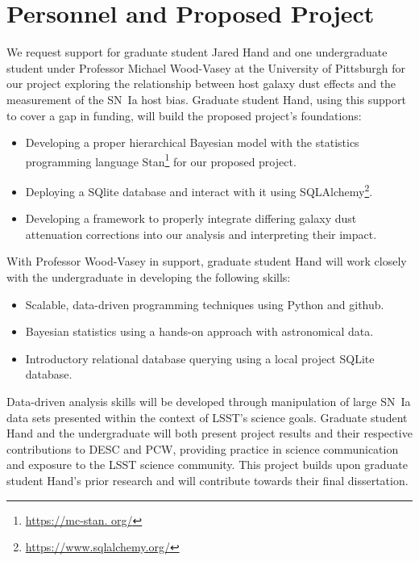 \documentclass[modern]{aastex63}
\begin{document}
\section{Personnel and Proposed Project}
We request support for graduate student Jared Hand and one undergraduate student under Professor Michael Wood-Vasey at the University of Pittsburgh for our project exploring the relationship between host galaxy dust effects and the measurement of the SN~Ia host bias.
Graduate student Hand, using this support to cover a gap in funding, will build the proposed project's foundations:
\begin{itemize}
    \item Developing a proper hierarchical Bayesian model with the statistics programming language Stan\footnote{\url{https://mc-stan.
    org/}} for our proposed project.
    \item Deploying a SQlite database and interact with it using SQLAlchemy\footnote{\url{https://www.sqlalchemy.org/}}.
    \item Developing a framework to properly integrate differing galaxy dust attenuation corrections into our analysis and interpreting their impact.
\end{itemize}
With Professor Wood-Vasey in support, graduate student Hand will work closely with the undergraduate in developing the following skills:
\begin{itemize}
    \item Scalable, data-driven programming techniques using Python and github.
    \item Bayesian statistics using a hands-on approach with astronomical data. 
    \item Introductory relational database querying using a local project SQLite database.
\end{itemize}
Data-driven analysis skills will be developed through manipulation of large SN~Ia data sets presented within the context of LSST's science goals.
Graduate student Hand and the undergraduate will both present project results and their respective contributions to DESC and PCW, providing practice in science communication and exposure to the LSST science community.
This project builds upon graduate student Hand's prior research and will contribute towards their final dissertation.
\end{document}
